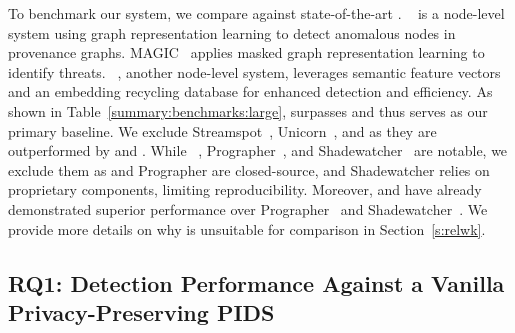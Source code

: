  To benchmark our system, we compare against state-of-the-art \pids. \threatrace~\cite{wang2022threatrace} is a node-level system using graph representation learning to detect anomalous nodes in provenance graphs. MAGIC~\cite{jia2023magic} applies masked graph representation learning to identify threats. \flash~\cite{flash2024}, another node-level system, leverages semantic feature vectors and an embedding recycling database for enhanced detection and efficiency. As shown in Table~\ref{summary:benchmarks:large}, \flash surpasses  and thus serves as our primary baseline.  We exclude Streamspot~\cite{streamspot}, Unicorn~\cite{han2020unicorn}, and \threatrace as they are outperformed by \flash and \kairos. While \disdet~\cite{dong2023distdet}, Prographer~\cite{yangprographer}, and Shadewatcher~\cite{shadewatcher} are notable, we exclude them as \disdet and Prographer are closed-source, and Shadewatcher relies on proprietary components, limiting reproducibility. Moreover, \flash and \orthrus have already demonstrated superior performance over Prographer~\cite{yangprographer} and Shadewatcher~\cite{shadewatcher}. We provide more details on why \disdet is unsuitable for comparison in Section~\ref{s:relwk}.


\subsection{RQ1: Detection Performance Against a Vanilla Privacy-Preserving PIDS}
\label{sub:detect:perf:vanilla}



